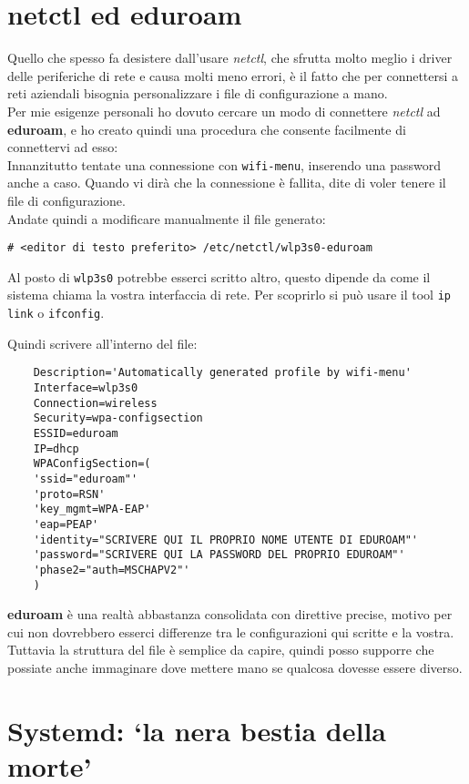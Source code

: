 \documentclass[twoside,italian]{book}
\newcommand{\code}[1]{\texttt{#1}}
\newcommand{\centcode}[1]{

\definecolor{codice}{rgb}{0.5,0.1,0.1}

	\begin{center}
		\color{codice}
		\code{#1}
	\end{center}


}
\begin{document}
		\section{netctl ed eduroam}
			Quello che spesso fa desistere dall'usare \textit{netctl}, che sfrutta molto meglio i driver delle periferiche di rete e causa molti meno errori, è il fatto che per connettersi a reti aziendali bisognia personalizzare i file di configurazione a mano. \\
			Per mie esigenze personali ho dovuto cercare un modo di connettere \textit{netctl} ad \textbf{eduroam}, e ho creato quindi una procedura che consente facilmente di connettervi ad esso:\\
			Innanzitutto tentate una connessione con \code{wifi-menu}, inserendo una password anche a caso. Quando vi dirà che la connessione è fallita, dite di voler tenere il file di configurazione.\\
			Andate quindi a modificare manualmente il file generato:\centcode{\# <editor di testo preferito> /etc/netctl/wlp3s0-eduroam}
			
			\begin{tcolorbox}[floatplacement=b,width=\textwidth,colback={blue},title={NOTA BENE:},colbacktitle=gray,coltitle=white,colupper=white]
				Al posto di \code{wlp3s0} potrebbe esserci scritto altro, questo dipende da come il sistema chiama la vostra interfaccia di rete. Per scoprirlo si può usare il tool \code{ip link} o \code{ifconfig}.
			\end{tcolorbox}
			
			Quindi scrivere all'interno del file:
\begin{lstlisting}
	Description='Automatically generated profile by wifi-menu'
	Interface=wlp3s0
	Connection=wireless
	Security=wpa-configsection
	ESSID=eduroam
	IP=dhcp
	WPAConfigSection=(
	'ssid="eduroam"'
	'proto=RSN'
	'key_mgmt=WPA-EAP'
	'eap=PEAP'
	'identity="SCRIVERE QUI IL PROPRIO NOME UTENTE DI EDUROAM"'
	'password="SCRIVERE QUI LA PASSWORD DEL PROPRIO EDUROAM"'
	'phase2="auth=MSCHAPV2"'
	)
\end{lstlisting}
			
			\textbf{eduroam} è una realtà abbastanza consolidata con direttive precise, motivo per cui non dovrebbero esserci differenze tra le configurazioni qui scritte e la vostra. Tuttavia la struttura del file è semplice da capire, quindi posso supporre che possiate anche immaginare dove mettere mano se qualcosa dovesse essere diverso.
			
		
		\section{Systemd: `la nera bestia della morte'}
			
\end{document}
